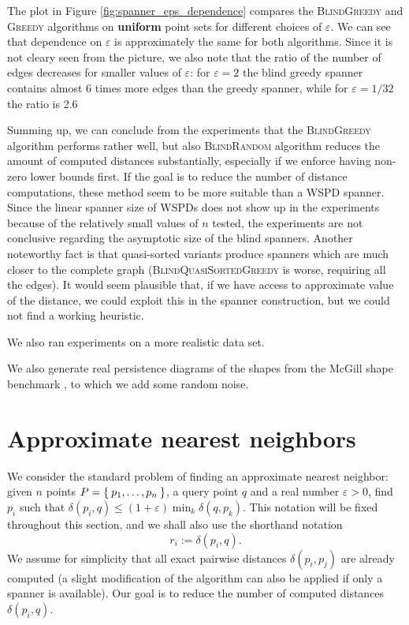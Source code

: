 \documentclass[a4paper,UKenglish,cleveref, autoref]{lipics-v2019}
\newcommand{\eps}{\varepsilon}
\newcommand{\dist}{\delta}
\begin{document}
The plot in Figure \ref{fig:spanner_eps_dependence}
compares the \textsc{BlindGreedy} and \textsc{Greedy} algorithms
on \textbf{uniform} point sets for different choices of $\eps$. We can see that dependence on $\eps$
is approximately the same for both algorithms. Since it is not cleary seen from the picture, we also note 
that the ratio of the number of edges decreases for
smaller values of $\eps$: 
for $\eps = 2$ the blind greedy spanner contains almost 6 times more edges than the greedy spanner,
while for $\eps = 1/32$ the ratio is 2.6

Summing up, we can conclude from the experiments that 
 the \textsc{BlindGreedy} algorithm performs rather well, but also \textsc{BlindRandom}
algorithm reduces the amount of computed distances substantially, especially if we enforce having non-zero lower bounds
first. 
If the goal is to reduce the number of distance computations, these method seem to be more suitable than a WSPD spanner.
Since the linear spanner size of WSPDs does not show up in the experiments because of the relatively small values of $n$
tested, the experiments are not conclusive regarding the asymptotic size of the blind spanners.
Another noteworthy fact is that quasi-sorted variants produce spanners which are much closer to the complete graph
(\textsc{BlindQuasiSortedGreedy} is worse, requiring all the edges). It would seem plausible that, if we have
access to approximate value of the distance, we could exploit this in the spanner construction, but we could not
find a working heuristic.



We also ran experiments on a more realistic data set.

We also generate real persistence diagrams of the shapes from  the McGill shape benchmark \cite{zhang2005mcgill}, 
to which we add some random noise. 


\section{Approximate nearest neighbors}
\label{sec:ann}
We consider the standard problem of finding an approximate nearest neighbor: given
$n$ points $P = \Set{p_1, \dots, p_n}$, a query point $q$ and a real number $\eps > 0$,
find $p_i$ such that $\dist(p_i, q) \leq (1 + \eps) \min_{k} \dist(q, p_k)$. This notation will be fixed throughout this 
section, and we shall also use the shorthand notation
\[
    r_i := \dist(p_i, q).
\]
We assume for simplicity
that all exact pairwise distances $\dist(p_i, p_j)$ are already computed
(a slight modification of the algorithm can also be applied if only a spanner is available).
Our goal is to reduce the number of computed distances $\dist(p_i, q)$. 
\end{document}
